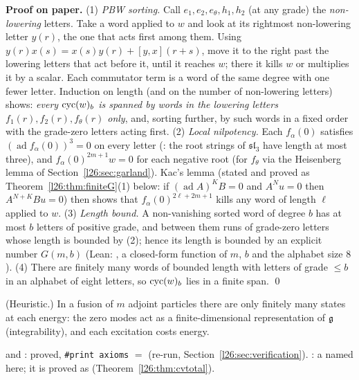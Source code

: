 \textbf{Proof on paper.} (1) \emph{PBW sorting.} Call $e_1,e_2,e_\theta,h_1,h_2$ (at any grade) the \emph{non-lowering} letters.
Take a word applied to $w$ and look at its rightmost non-lowering letter $y(r)$, the one that acts first among them. Using
$y(r)x(s)=x(s)y(r)+[y,x](r+s)$, move it to the right past the lowering letters that act before it, until it reaches $w$; there it
kills $w$ or multiplies it by a scalar. Each commutator term is a word of the same degree with one fewer letter. Induction on
length (and on the number of non-lowering letters) shows: \emph{every $\operatorname{cyc}(w)_b$ is spanned by words in the lowering
letters $f_1(r),f_2(r),f_\theta(r)$ only}, and, sorting further, by such words in a fixed order with the grade-zero letters acting
first. (2) \emph{Local nilpotency.} Each $f_\alpha(0)$ satisfies $(\operatorname{ad}f_\alpha(0))^3=0$ on every letter
(: the root strings of $\mathfrak{sl}_3$ have length at most three), and $f_\alpha(0)^{2m+1}w=0$ for each
negative root (for $f_\theta$ via the Heisenberg lemma of Section~\ref{l26:sec:garland}). Kac's lemma (stated and proved as
Theorem~\ref{l26:thm:finiteG}(1) below: if $(\operatorname{ad}A)^KB=0$ and $A^Nu=0$ then $A^{N+K}Bu=0$) then shows that
$f_\alpha(0)^{2\ell+2m+1}$ kills any word of length $\ell$ applied to $w$. (3) \emph{Length bound.} A non-vanishing sorted
word of degree $b$ has at most $b$ letters of positive grade, and between them runs of grade-zero letters whose length is bounded
by (2); hence its length is bounded by an explicit number $G(m,b)$ (Lean: , a closed-form function of $m$, $b$ and
the alphabet size $8$). (4) There are finitely many words of bounded length with letters of grade $\le b$ in an alphabet of eight
letters, so $\operatorname{cyc}(w)_b$ lies in a finite span. \qed

\begin{physics}
(Heuristic.) In a fusion of $m$ adjoint particles there are only finitely many states at each energy: the zero modes act as a
finite-dimensional representation of $\mathfrak g$ (integrability), and each excitation costs energy.
\end{physics}

\begin{status}
 and : proved, \texttt{\#print axioms} $=$
 (re-run, Section~\ref{l26:sec:verification}).
: a named  here; it is proved as  (Theorem~\ref{l26:thm:cvtotal}).
\end{status}

